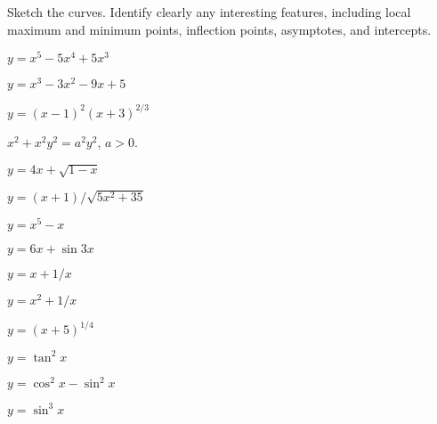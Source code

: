 \begin{exercises}

Sketch the curves. Identify clearly any interesting features, including
local maximum and minimum points, inflection points, asymptotes, and
intercepts. 

\twocol

\begin{exercise} $y=x^5-5x^4+5x^3$
\end{exercise}

\begin{exercise} $y=x^3-3x^2-9x+5$
\end{exercise}

\begin{exercise} $y=(x-1)^2(x+3)^{2/3}$
\end{exercise}

\begin{exercise} $x^2+x^2y^2=a^2y^2$, $a>0$.
\end{exercise}

\begin{exercise} $y = 4x+\sqrt{1-x}$
\end{exercise}

\begin{exercise} $y = (x+1)/\sqrt{5x^2 + 35}$
\end{exercise}

\begin{exercise} $y= x^5 - x$
\end{exercise}

\begin{exercise} $y = 6x + \sin 3x$
\end{exercise}

\begin{exercise} $y = x+ 1/x$
\end{exercise}

\begin{exercise} $y = x^2+ 1/x$
\end{exercise}

\begin{exercise} $y = (x+5)^{1/4}$
\end{exercise}

\begin{exercise} $y = \tan^2 x$
\end{exercise}

\begin{exercise} $y =\cos^2 x - \sin^2 x$
\end{exercise}

\begin{exercise} $y = \sin^3 x$
\end{exercise}


\end{exercises}
